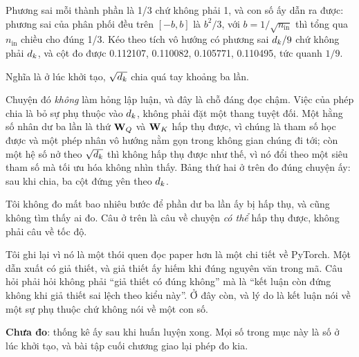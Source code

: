Phương sai mỗi thành phần là 1/3 chứ không phải 1, và con số ấy dẫn ra được:
phương sai của phân phối đều trên \([-b, b]\) là \(b^2/3\), với
\(b = 1/\sqrt{n_{\mathrm{in}}}\) thì tổng qua \(n_{\mathrm{in}}\) chiều cho
đúng 1/3. Kéo theo tích vô hướng có phương sai \(d_{k}/9\) chứ không phải
\(d_{k}\), và cột  đo được 0.112107, 0.110082, 0.105771, 0.110495,
tức quanh \(1/9\).

Nghĩa là ở lúc khởi tạo, \(\sqrt{d_{k}}\) chia quá tay khoảng ba lần.

Chuyện đó \emph{không} làm hỏng lập luận, và đây là chỗ đáng đọc chậm. Việc của
phép chia là bỏ sự phụ thuộc vào \(d_{k}\), không phải đặt một thang tuyệt đối.
Một hằng số nhân dư ba lần là thứ \(\mathbf{W}_Q\) và \(\mathbf{W}_K\) hấp thụ được,
vì chúng là tham số học được và một phép nhân vô hướng nằm gọn trong không gian
chúng đi tới; còn một hệ số nở theo \(\sqrt{d_{k}}\) thì không hấp thụ được như
thế, vì nó đổi theo một siêu tham số mà tối ưu hóa không nhìn thấy. Bảng thứ
hai ở trên đo đúng chuyện ấy: sau khi chia, ba cột đứng yên theo \(d_{k}\).

Tôi không đo mất bao nhiêu bước để phần dư ba lần ấy bị hấp thụ, và cũng không
tìm thấy ai đo. Câu ở trên là câu về chuyện \emph{có thể} hấp thụ được, không
phải câu về tốc độ.

Tôi ghi lại vì nó là một thói quen đọc paper hơn là một chi tiết về PyTorch. Một
dẫn xuất có giả thiết, và giả thiết ấy hiếm khi đúng nguyên văn trong mã. Câu
hỏi phải hỏi không phải \enquote{giả thiết có đúng không} mà là \enquote{kết
luận còn đứng không khi giả thiết sai lệch theo kiểu này}. Ở đây còn, và lý do
là kết luận nói về một sự phụ thuộc chứ không nói về một con số.

\textbf{Chưa đo}: thống kê ấy sau khi huấn luyện xong. Mọi số trong mục này là
số ở lúc khởi tạo, và bài tập cuối chương giao lại phép đo kia.
